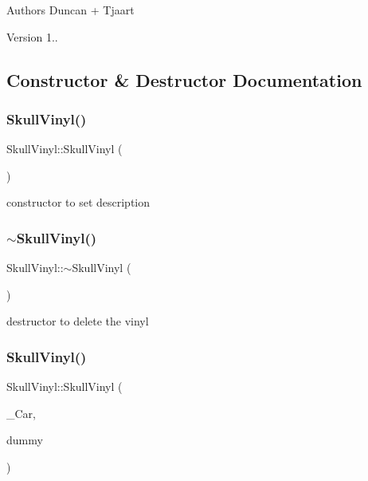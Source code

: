 \begin{DoxyAuthor}{Authors}
Duncan + Tjaart 
\end{DoxyAuthor}
\begin{DoxyVersion}{Version}
1.. 
\end{DoxyVersion}


\subsection{Constructor \& Destructor Documentation}
\mbox{\label{class_skull_vinyl_a360c56731f21884f2556e03217a83cbe}} 
\subsubsection{\texorpdfstring{Skull\+Vinyl()}{SkullVinyl()}\hspace{0.1cm}{\footnotesize\ttfamily [1/2]}}
{\footnotesize\ttfamily Skull\+Vinyl\+::\+Skull\+Vinyl (\begin{DoxyParamCaption}{ }\end{DoxyParamCaption})\hspace{0.3cm}{\ttfamily [inline]}}

constructor to set description \mbox{\label{class_skull_vinyl_a214daefd097accf5e958ba6c9e445862}} 
\subsubsection{\texorpdfstring{$\sim$\+Skull\+Vinyl()}{~SkullVinyl()}}
{\footnotesize\ttfamily Skull\+Vinyl\+::$\sim$\+Skull\+Vinyl (\begin{DoxyParamCaption}{ }\end{DoxyParamCaption})\hspace{0.3cm}{\ttfamily [inline]}}

destructor to delete the vinyl \mbox{\label{class_skull_vinyl_aec437f032e0334c530dd940659a1d881}} 
\subsubsection{\texorpdfstring{Skull\+Vinyl()}{SkullVinyl()}\hspace{0.1cm}{\footnotesize\ttfamily [2/2]}}
{\footnotesize\ttfamily Skull\+Vinyl\+::\+Skull\+Vinyl (\begin{DoxyParamCaption}\item[{\mbox{\hyperlink{class_skull_vinyl}{Skull\+Vinyl}}}]{\+\_\+\+Car,  }\item[{bool}]{dummy }\end{DoxyParamCaption})\hspace{0.3cm}{\ttfamily [inline]}}

